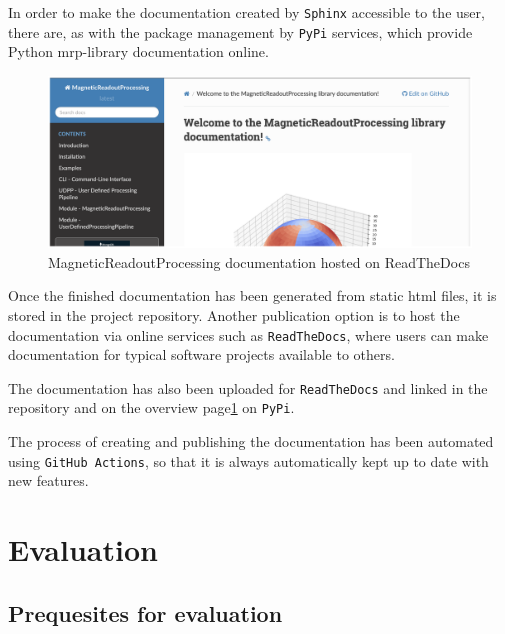 In order to make the documentation created by
\passthrough{\lstinline!Sphinx!} accessible to the user, there are, as
with the package management by \passthrough{\lstinline!PyPi!} services,
which provide Python \gls{mrp}-library documentation online.

\begin{figure}
\centering
\includegraphics{./generated_images/border_MagneticReadoutProcessing_documentation_hosted_on_ReadTheDocs.png}
\caption{MagneticReadoutProcessing documentation hosted on ReadTheDocs
\label{MagneticReadoutProcessing_documentation_hosted_on_ReadTheDocs.png}}
\end{figure}

Once the finished documentation has been generated from static
\gls{html} files, it is stored in the project repository. Another
publication option is to host the documentation via online services such
as \passthrough{\lstinline!ReadTheDocs!}\cite{ReadTheDocs}, where
users can make documentation for typical software projects available to
others.

The documentation has also been uploaded for
\passthrough{\lstinline!ReadTheDocs!}\cite{MagneticReadoutProcessingReadTheDocs}
and linked in the repository and on the overview
page\ref{MagneticReadoutProcessing_documentation_hosted_on_ReadTheDocs.png}
on \passthrough{\lstinline!PyPi!}.

The process of creating and publishing the documentation has been
automated using
\passthrough{\lstinline!GitHub Actions!}\cite{GithubActions}, so
that it is always automatically kept up to date with new features.

\hypertarget{evaluation}{%
\chapter{Evaluation}\label{evaluation}}

\hypertarget{prequesites-for-evaluation}{%
\section{Prequesites for evaluation}\label{prequesites-for-evaluation}}

